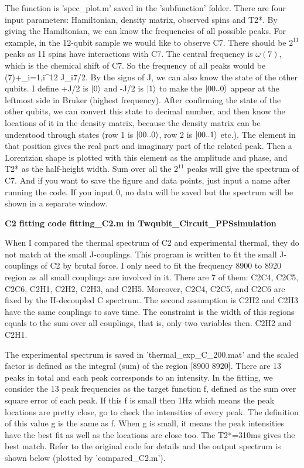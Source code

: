 The function is 'spec\_plot.m' saved in the '\dir subfunction' folder. There are four input parameters: Hamiltonian, density matrix, observed spins and T2*. By giving the Hamiltonian, we can know the frequencies of all possible peaks. For example, in the 12-qubit sample we would like to observe C7. There should be $2^{11}$ peaks as 11 spins have interactions with C7. The central frequency is $\omega(7)$, which is the chemical shift of C7. So the frequency of all peaks would be
\be
\omega(7)+\sum_{i=1,i}^{12} \pm J_{i7}/2.
\ee
By the signs of J, we can also know the state of the other qubits. I define +J/2 is $|0\rangle$ and -J/2 is $|1\rangle$ to make the $|00..0\rangle$ appear at  the leftmost side in Bruker (highest frequency). After confirming the state of the other qubits, we can convert this state to decimal number, and then know the locations of it in the density matrix, because the density matrix can be understood through states (row 1 is $|00..0\rangle$, row 2 is $|00..1\rangle$ etc.). The element in that position gives the real part and imaginary part of the related peak. Then a Lorentzian shape is plotted with this element as the amplitude and phase, and T2* as the half-height width. Sum over all the $2^{11}$ peaks will give the spectrum of C7. And if you want to save the figure and data points, just input a name after running the code. If you input 0, no data will be saved but the spectrum will be shown in a separate window.

\textbf{C2 fitting code fitting\_C2.m in \dir Twqubit\_Circuit\_PPS\dir simulation}

When I compared the thermal spectrum of C2 and experimental thermal, they do not match at the small J-couplings. This program is written to fit the small J-couplings of C2 by brutal force. I only need to fit the frequency 8900 to 8920 region as all small couplings are involved in it. There are 7 of them: C2C4, C2C5, C2C6, C2H1, C2H2, C2H3, and C2H5. Moreover, C2C4, C2C5, and C2C6 are fixed by the H-decoupled C spectrum. The second assumption is C2H2 and C2H3 have the same couplings to save time. The constraint is the width of this regions equals to the sum over all couplings, that is, only two variables then. C2H2 and C2H1.

The experimental spectrum is saved in 'thermal\_exp\_C\_200.mat' and the scaled factor is defined as the integral (sum) of the region [8900 8920]. There are 13 peaks in total and each peak corresponds to an intensity. In the fitting, we consider the 13 peak frequencies as the target function f, defined as the sum over square error of each peak. If this f is small then 1Hz which means the peak locations are pretty close, go to check the intensities of every peak. The definition of this value g is the same as f. When g is small, it means the peak intensities have the best fit as well as the locations are close too. The T2*=310ms gives the best match. Refer to the original code for details and the output spectrum is shown below (plotted by 'compared\_C2.m').

